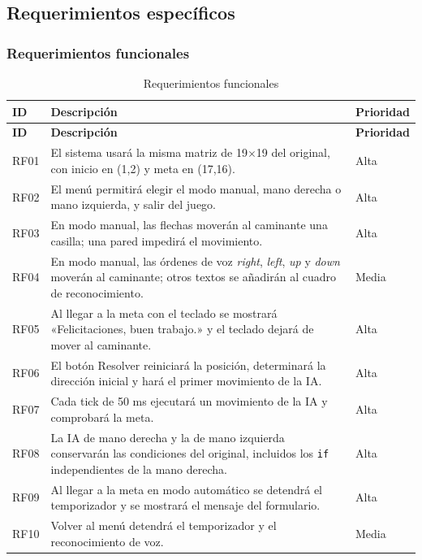 \documentclass[12pt,a4paper]{article}
\begin{document}
\subsection{Requerimientos específicos}

\subsubsection{Requerimientos funcionales}
\begin{longtable}{p{1.3cm}p{9.2cm}p{2.6cm}}
\caption{Requerimientos funcionales}\\
\toprule
\textbf{ID} & \textbf{Descripción} & \textbf{Prioridad}\\
\midrule\endfirsthead
\toprule
\textbf{ID} & \textbf{Descripción} & \textbf{Prioridad}\\
\midrule\endhead
RF01 & El sistema usará la misma matriz de 19$\times$19 del original, con inicio en (1,2) y meta en (17,16). & Alta\\
RF02 & El menú permitirá elegir el modo manual, mano derecha o mano izquierda, y salir del juego. & Alta\\
RF03 & En modo manual, las flechas moverán al caminante una casilla; una pared impedirá el movimiento. & Alta\\
RF04 & En modo manual, las órdenes de voz \emph{right}, \emph{left}, \emph{up} y \emph{down} moverán al caminante; otros textos se añadirán al cuadro de reconocimiento. & Media\\
RF05 & Al llegar a la meta con el teclado se mostrará «Felicitaciones, buen trabajo.» y el teclado dejará de mover al caminante. & Alta\\
RF06 & El botón Resolver reiniciará la posición, determinará la dirección inicial y hará el primer movimiento de la IA. & Alta\\
RF07 & Cada tick de 50 ms ejecutará un movimiento de la IA y comprobará la meta. & Alta\\
RF08 & La IA de mano derecha y la de mano izquierda conservarán las condiciones del original, incluidos los \texttt{if} independientes de la mano derecha. & Alta\\
RF09 & Al llegar a la meta en modo automático se detendrá el temporizador y se mostrará el mensaje del formulario. & Alta\\
RF10 & Volver al menú detendrá el temporizador y el reconocimiento de voz. & Media\\
\bottomrule
\end{longtable}
\end{document}
